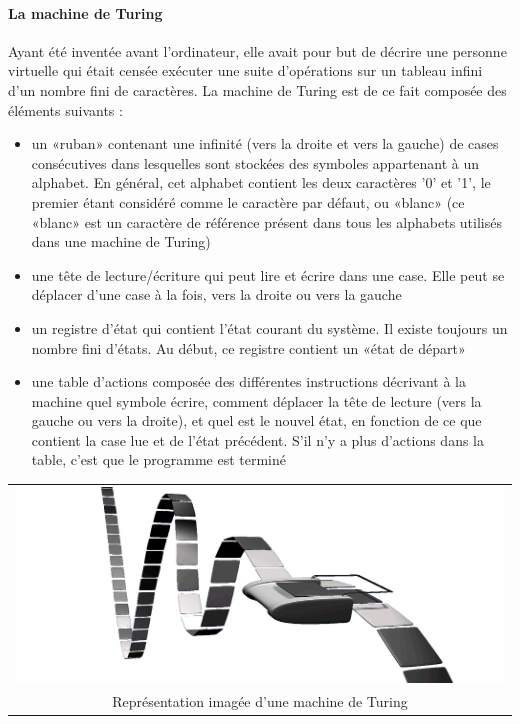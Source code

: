 \paragraph{La machine de Turing}

Ayant été inventée avant l'ordinateur, elle avait pour but de décrire une personne virtuelle qui était censée exécuter une suite d'opérations sur un tableau infini d'un nombre fini de caractères. La machine de Turing est de ce fait composée des éléments suivants :
\begin{itemize}
\item un «ruban» contenant une infinité (vers la droite et vers la gauche) de cases consécutives dans lesquelles sont stockées des symboles appartenant à un alphabet. En général, cet alphabet contient les deux caractères '0' et '1', le premier étant considéré comme le caractère par défaut, ou «blanc» (ce «blanc» est un caractère de référence présent dans tous les alphabets utilisés dans une machine de Turing)
\item une tête de lecture/écriture qui peut lire et écrire dans une case. Elle peut se déplacer d'une case à la fois, vers la droite ou vers la gauche
\item un registre d'état qui contient l'état courant du système. Il existe toujours un nombre fini d'états. Au début, ce registre contient un «état de départ»
\item une table d'actions composée des différentes instructions décrivant à la machine quel symbole écrire, comment déplacer la tête de lecture (vers la gauche ou vers la droite), et quel est le nouvel état, en fonction de ce que contient la case lue et de l'état précédent. S'il n'y a plus d'actions dans la table, c'est que le programme est terminé\\
\end{itemize}

\begin{center}
\begin{tabular}{c}
\includegraphics[scale=0.15]{img/turing}\\
Représentation imagée d'une machine de Turing
\end{tabular}
\end{center}

